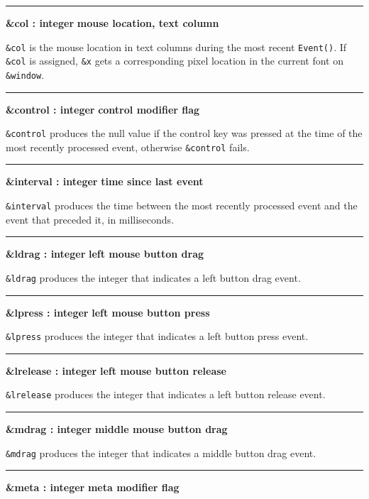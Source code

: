 \bigskip\hrule\vspace{0.1cm}
\noindent
{\bf \&col : integer } \hfill {\bf mouse location, text column}

\noindent
\texttt{\&col} is the mouse location in text columns during the most
recent \texttt{Event()}. If \texttt{\&col} is assigned, \texttt{\&x}
gets a corresponding pixel location in the current font on
\texttt{\&window}.

\bigskip\hrule\vspace{0.1cm}
\noindent
{\bf \&control : integer } \hfill {\bf control modifier flag}

\noindent
\texttt{\&control} produces the null value if the control key was
pressed at the time of the most recently processed event, otherwise
\texttt{\&control} fails.

\bigskip\hrule\vspace{0.1cm}
\noindent
{\bf \&interval : integer } \hfill {\bf time since last event}

\noindent
\texttt{\&interval} produces the time between the most recently
processed event and the event that preceded it, in milliseconds.

\bigskip\hrule\vspace{0.1cm}
\noindent
{\bf \&ldrag : integer } \hfill {\bf left mouse button drag}

\noindent
\texttt{\&ldrag} produces the integer that indicates a left button drag
event.

\bigskip\hrule\vspace{0.1cm}
\noindent
{\bf \&lpress : integer } \hfill {\bf left mouse button press}

\noindent
\texttt{\&lpress} produces the integer that indicates a left button
press event.

\bigskip\hrule\vspace{0.1cm}
\noindent
{\bf \&lrelease : integer } \hfill {\bf left mouse button release}

\noindent
\texttt{\&lrelease} produces the integer that indicates a left button
release event.

\bigskip\hrule\vspace{0.1cm}
\noindent
{\bf \&mdrag : integer } \hfill {\bf  middle mouse button drag}

\noindent
\texttt{\&mdrag} produces the integer that indicates a middle button drag event.

\bigskip\hrule\vspace{0.1cm}
\noindent
{\bf \&meta : integer } \hfill {\bf meta modifier flag}

